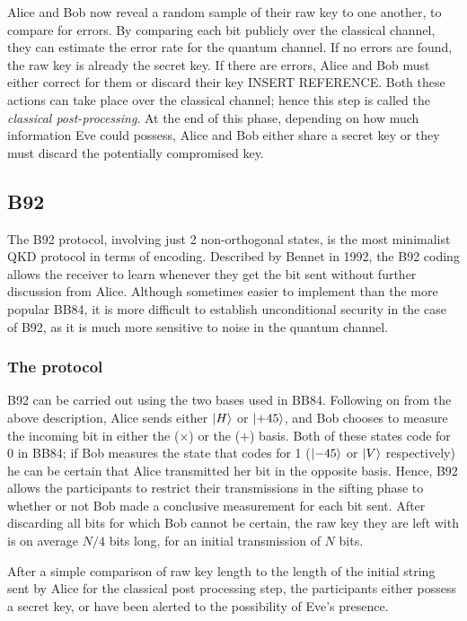 \documentclass[paper=a4, fontsize=11pt]{scrartcl} %
\numberwithin{equation}{section} %
\numberwithin{figure}{section} %
\numberwithin{table}{section} %
\begin{document}
Alice and Bob now reveal a random sample of their raw key to one another, to compare for errors. By
comparing each bit publicly over the classical channel, they can estimate the error rate for
the quantum channel. If no errors are found, the raw key is already the secret key. If there are
errors, Alice and Bob must either correct for them or discard their key INSERT REFERENCE. Both these actions can
take place over the classical channel; hence this step is called the \textit{classical post-processing}.
At the end of this phase, depending on how much information Eve could possess, Alice and Bob either share
a secret key or they must discard the potentially compromised key.

\subsection{B92}
The B92 protocol, involving just 2 non-orthogonal states, is the most minimalist QKD protocol in terms
of encoding. Described by Bennet in 1992, %
the B92 coding allows the receiver to learn
whenever they get the bit sent without further discussion from Alice. Although sometimes easier to implement
than the more popular BB84, it is more difficult to establish unconditional security in the case of B92,
as it is much more sensitive to noise in the quantum channel.

\subsubsection{The protocol}
B92 can be carried out using the two bases used in BB84. Following on from the above description, Alice sends either
$\ket{H}$ or $\ket{+45}$, and Bob chooses to measure the incoming bit in either the ($\times$) or the ($+$)
basis. Both of these states code for 0 in BB84; if Bob measures the state that codes for 1 ($\ket{-45}$ or
$\ket{V}$ respectively) he can be certain that Alice transmitted her bit in the opposite basis. Hence, B92
allows the participants to restrict their transmissions in the sifting phase to whether or not Bob made
a conclusive measurement for each bit sent. After discarding all bits for which Bob cannot be certain, the raw
key they are left with is on average $N/4$ bits long, for an initial transmission of $N$ bits.

After a simple comparison of raw key length to the length of the initial string sent by Alice for the classical
post processing step, the participants either possess a secret key, or have been alerted to the possibility
of Eve's presence.
\end{document}
